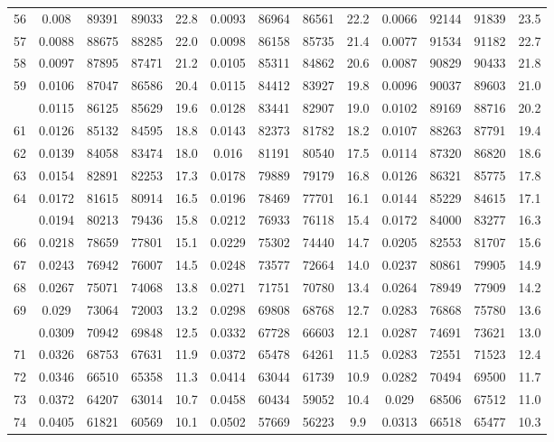 \documentclass[
  14pt,
]{article}
\begin{document}
\begin{longtable}[t]{lcccccccccccc}
56 & 0.008 & 89391 & 89033 & 22.8 & 0.0093 & 86964 & 86561 & 22.2 & 0.0066 & 92144 & 91839 & 23.5\\
57 & 0.0088 & 88675 & 88285 & 22.0 & 0.0098 & 86158 & 85735 & 21.4 & 0.0077 & 91534 & 91182 & 22.7\\
58 & 0.0097 & 87895 & 87471 & 21.2 & 0.0105 & 85311 & 84862 & 20.6 & 0.0087 & 90829 & 90433 & 21.8\\
59 & 0.0106 & 87047 & 86586 & 20.4 & 0.0115 & 84412 & 83927 & 19.8 & 0.0096 & 90037 & 89603 & 21.0\\
\addlinespace
60 & 0.0115 & 86125 & 85629 & 19.6 & 0.0128 & 83441 & 82907 & 19.0 & 0.0102 & 89169 & 88716 & 20.2\\
61 & 0.0126 & 85132 & 84595 & 18.8 & 0.0143 & 82373 & 81782 & 18.2 & 0.0107 & 88263 & 87791 & 19.4\\
62 & 0.0139 & 84058 & 83474 & 18.0 & 0.016 & 81191 & 80540 & 17.5 & 0.0114 & 87320 & 86820 & 18.6\\
63 & 0.0154 & 82891 & 82253 & 17.3 & 0.0178 & 79889 & 79179 & 16.8 & 0.0126 & 86321 & 85775 & 17.8\\
64 & 0.0172 & 81615 & 80914 & 16.5 & 0.0196 & 78469 & 77701 & 16.1 & 0.0144 & 85229 & 84615 & 17.1\\
\addlinespace
65 & 0.0194 & 80213 & 79436 & 15.8 & 0.0212 & 76933 & 76118 & 15.4 & 0.0172 & 84000 & 83277 & 16.3\\
66 & 0.0218 & 78659 & 77801 & 15.1 & 0.0229 & 75302 & 74440 & 14.7 & 0.0205 & 82553 & 81707 & 15.6\\
67 & 0.0243 & 76942 & 76007 & 14.5 & 0.0248 & 73577 & 72664 & 14.0 & 0.0237 & 80861 & 79905 & 14.9\\
68 & 0.0267 & 75071 & 74068 & 13.8 & 0.0271 & 71751 & 70780 & 13.4 & 0.0264 & 78949 & 77909 & 14.2\\
69 & 0.029 & 73064 & 72003 & 13.2 & 0.0298 & 69808 & 68768 & 12.7 & 0.0283 & 76868 & 75780 & 13.6\\
\addlinespace
70 & 0.0309 & 70942 & 69848 & 12.5 & 0.0332 & 67728 & 66603 & 12.1 & 0.0287 & 74691 & 73621 & 13.0\\
71 & 0.0326 & 68753 & 67631 & 11.9 & 0.0372 & 65478 & 64261 & 11.5 & 0.0283 & 72551 & 71523 & 12.4\\
72 & 0.0346 & 66510 & 65358 & 11.3 & 0.0414 & 63044 & 61739 & 10.9 & 0.0282 & 70494 & 69500 & 11.7\\
73 & 0.0372 & 64207 & 63014 & 10.7 & 0.0458 & 60434 & 59052 & 10.4 & 0.029 & 68506 & 67512 & 11.0\\
74 & 0.0405 & 61821 & 60569 & 10.1 & 0.0502 & 57669 & 56223 & 9.9 & 0.0313 & 66518 & 65477 & 10.3\\

\end{longtable}
\end{document}
